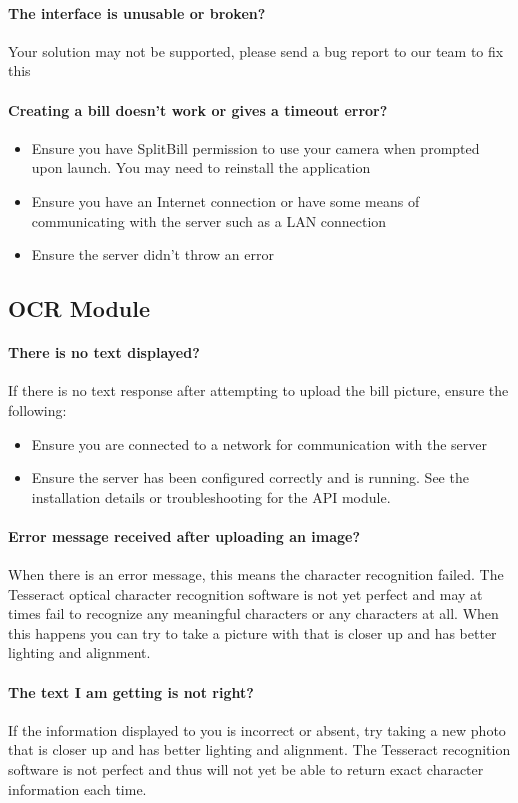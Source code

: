 \documentclass[12pt,a4paper]{article}
\begin{document}
\paragraph{The interface is unusable or broken?}
Your solution may not be supported, please send a bug report to our team to fix this 
\paragraph{Creating a bill doesn't work or gives a timeout error?}
\begin{itemize}
\item Ensure you have SplitBill permission to use your camera when prompted upon launch. You may need to reinstall the application
\item Ensure you have an Internet connection or have some means of communicating with the server such as a LAN connection
\item Ensure the server didn't throw an error
\end{itemize}
    
    \subsection{OCR Module} 
     \paragraph{There is no text displayed?}
     If there is no text response after attempting to upload the bill picture, ensure the following: 
    \begin{itemize}
    \item Ensure you are connected to a network for communication with the server
    \item Ensure the server has been configured correctly and is running. See the installation details or troubleshooting for the API module.
    \end{itemize}
    \paragraph{Error message received after uploading an image?}
    When there is an error message, this means the character recognition failed. The Tesseract optical character recognition software is not yet perfect and may at times fail to recognize any meaningful characters or any characters at all. When this happens you can try to take a picture with that is closer up and has better lighting and alignment. 
    \paragraph{The text I am getting is not right? }
    If the information displayed to you is incorrect or absent, try taking a new photo that is closer up and has better lighting and alignment. The Tesseract recognition software is not perfect and thus will not yet be able to return exact character information each time. 
   
\end{document}
